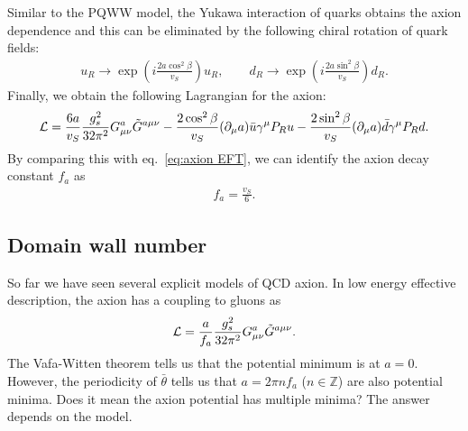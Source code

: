 \documentclass[11pt,a4paper]{article}
\begin{document}
Similar to the PQWW model, the Yukawa interaction of quarks obtains the axion dependence and this can be eliminated by the following chiral rotation of quark fields:
\begin{align}
    u_R \to \exp\left( i \frac{2a \cos^2\beta}{v_S} \right) u_R, \qquad
    d_R \to \exp\left( i \frac{2a \sin^2\beta}{v_S} \right) d_R.
\end{align}
Finally, we obtain the following Lagrangian for the axion:
\begin{align}
    {\cal L} = \frac{6a}{v_S} \frac{g_s^2}{32\pi^2} G_{\mu\nu}^a \tilde G^{a\mu\nu} - \frac{2\cos^2\beta}{v_S} (\partial_\mu a)\bar u \gamma^\mu P_R u - \frac{2\sin^2\beta}{v_S} (\partial_\mu a)\bar d \gamma^\mu P_R d.
\end{align}
By comparing this with eq.~\eqref{eq:axion EFT}, we can identify the axion decay constant $f_a$ as
\begin{align}
    f_a = \frac{v_S}{6}.
\end{align}


\subsection{Domain wall number}
So far we have seen several explicit models of QCD axion. In low energy effective description, the axion has a coupling to gluons as
\begin{align}
    {\cal L} = \frac{a}{f_a} \frac{g_s^2}{32\pi^2} G_{\mu\nu}^a \tilde G^{a\mu\nu}.
\end{align}
The Vafa-Witten theorem tells us that the potential minimum is at $a = 0$. However, the periodicity of $\bar\theta$ tells us that $a = 2\pi n f_a$ ($n \in \mathbb{Z}$) are also potential minima. Does it mean the axion potential has multiple minima? The answer depends on the model.
\end{document}
